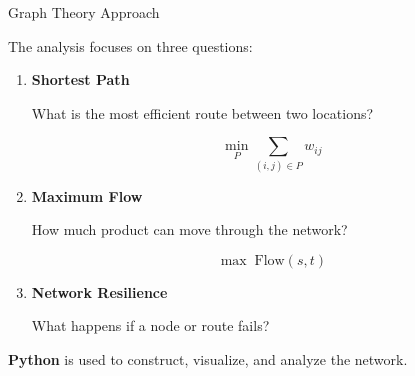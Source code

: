 \documentclass[aspectratio=169]{beamer}
\begin{document}
\begin{frame}{Graph Theory Approach}

The analysis focuses on three questions:

\vspace{0.4cm}

\begin{enumerate}

    \item \textbf{Shortest Path}

    What is the most efficient route between two locations?

    \vspace{0.3cm}

    \[
    \min_{P}\sum_{(i,j)\in P} w_{ij}
    \]

    \item \textbf{Maximum Flow}

    How much product can move through the network?

    \vspace{0.3cm}

    \[
    \max \; \text{Flow}(s,t)
    \]

    \item \textbf{Network Resilience}

    What happens if a node or route fails?

\end{enumerate}

\vspace{0.4cm}

\begin{center}
\textbf{Python} is used to construct, visualize, and analyze the network.
\end{center}

\end{frame}
\end{document}
